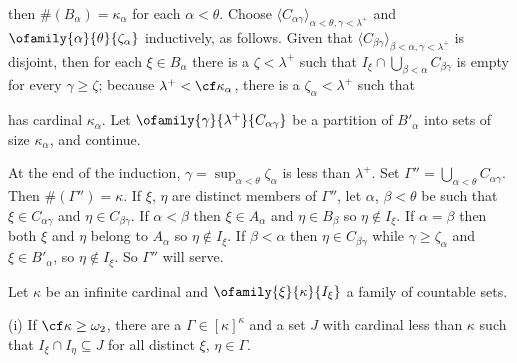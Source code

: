 {

\noindent then $\#(B_{\alpha})=\kappa_{\alpha}$
for each $\alpha<\theta$.   Choose
$\langle C_{\alpha\gamma}\rangle_{\alpha<\theta,\gamma<\lambda^+}$ and
$\ofamily{\alpha}{\theta}{\zeta_{\alpha}}$
inductively, as follows.   Given that
$\langle C_{\beta\gamma}\rangle_{\beta<\alpha,\gamma<\lambda^+}$ is
disjoint, then for each $\xi\in B_{\alpha}$ there is a $\zeta<\lambda^+$ such
that $I_{\xi}\cap\bigcup_{\beta<\alpha}C_{\beta\gamma}$ is empty for every
$\gamma\ge\zeta$;  because $\lambda^+<\cf\kappa_{\alpha}$, there is a
$\zeta_{\alpha}<\lambda^+$ such that


\noindent has cardinal $\kappa_{\alpha}$.   Let
$\ofamily{\gamma}{\lambda^+}{C_{\alpha\gamma}}$ be a partition of
$B'_{\alpha}$ into sets of size $\kappa_{\alpha}$, and continue.

At the end of the induction, $\gamma=\sup_{\alpha<\theta}\zeta_{\alpha}$ is
less than $\lambda^+$.   Set
$\Gamma''=\bigcup_{\alpha<\theta}C_{\alpha\gamma}$.   Then
$\#(\Gamma'')=\kappa$.   If $\xi$, $\eta$ are
distinct members of $\Gamma''$, let $\alpha$, $\beta<\theta$ be such that
$\xi\in C_{\alpha\gamma}$ and $\eta\in C_{\beta\gamma}$.   If
$\alpha<\beta$ then $\xi\in A_{\alpha}$ and $\eta\in B_{\beta}$ so
$\eta\notin I_{\xi}$.   If $\alpha=\beta$ then both $\xi$ and $\eta$ belong
to $A_{\alpha}$ so $\eta\notin I_{\xi}$.   If $\beta<\alpha$ then
$\eta\in C_{\beta\gamma}$ while $\gamma\ge\zeta_{\alpha}$ and
$\xi\in B'_{\alpha}$, so $\eta\notin I_{\xi}$.   So $\Gamma''$ will serve.
}%


Let $\kappa$ be an infinite cardinal and
$\ofamily{\xi}{\kappa}{I_{\xi}}$ a family of countable sets.

\quad(i) If $\cf\kappa\ge\omega_2$, there are a
$\Gamma\in[\kappa]^{\kappa}$ and a set $J$ with cardinal less than $\kappa$
such that $I_{\xi}\cap I_{\eta}\subseteq J$ for all distinct $\xi$,
$\eta\in\Gamma$.

